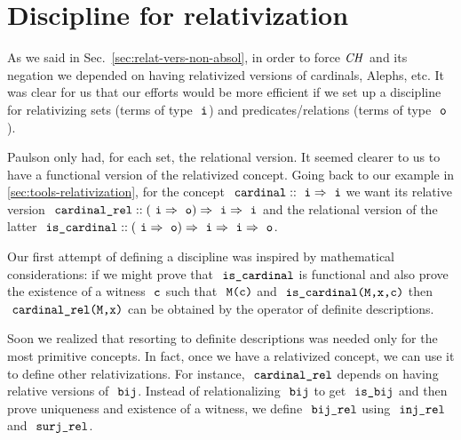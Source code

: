 \section{Discipline for relativization}
\label{sec:discipline-relativization}

As we said in Sec.~\ref{sec:relat-vers-non-absol}, in order to force
$\mathit{CH}$ and its negation we depended on having relativized versions of
cardinals, Alephs, etc. It was clear for us that our efforts would be
more efficient if we set up a discipline for relativizing sets (terms
of type $\tyi$) and predicates/relations (terms of type $\tyo$).

Paulson only had, for each set, the relational version. It seemed
clearer to us to have a functional version of the relativized concept.
Going back to our example in \ref{sec:tools-relativization}, for the
concept $\isatt{cardinal}::\tyi \fun \tyi$ we want its relative
version
$\isatt{cardinal{\uscore}rel}::(\tyi \fun \tyo) \fun \tyi \fun\tyi$
and the relational version of the latter
$\isatt{is{\uscore}cardinal}::(\tyi \fun \tyo) \fun \tyi \fun \tyi
\fun \tyo$.

Our first attempt of defining a discipline was inspired by
mathematical considerations: if we might prove that
$\isatt{is{\uscore}cardinal}$ is functional and also prove the
existence of a witness $\isatt{c}$ such that $\isatt{M(c)}$ and
$\isatt{is{\uscore}cardinal(M,x,c)}$ then
$\isatt{cardinal{\uscore}rel(M,x)}$ can be obtained by the operator of
definite descriptions.

Soon we realized that resorting to definite descriptions was needed
only for the most primitive concepts. In fact, once we have a
relativized concept, we can use it to define other relativizations.
For instance, $\isatt{cardinal{\uscore}rel}$ depends on having
relative versions of $\isatt{bij}$. Instead of relationalizing
$\isatt{bij}$ to get $\isatt{is{\uscore}bij}$ and then prove
uniqueness and existence of a witness, we define
$\isatt{bij{\uscore}rel}$ using $\isatt{inj{\uscore}rel}$ and
$\isatt{surj{\uscore}rel}$.

